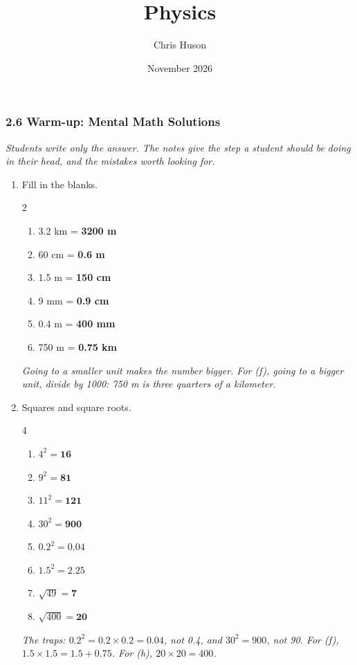 \documentclass[12pt, twoside]{article}
\title{Physics}
\author{Chris Huson}
\date{November 2026}
\begin{document}
\subsubsection*{2.6 Warm-up: Mental Math Solutions}

\emph{Students write only the answer. The notes give the step a student should be
doing in their head, and the mistakes worth looking for.}

\begin{enumerate}[itemsep=0.3cm]

\item Fill in the blanks.
  \begin{multicols}{2}
    \begin{enumerate}[itemsep=0.1cm]
      \item 3.2 km = \textbf{3200 m}
      \item 60 cm = \textbf{0.6 m}
      \item 1.5 m = \textbf{150 cm}
      \item 9 mm = \textbf{0.9 cm}
      \item 0.4 m = \textbf{400 mm}
      \item 750 m = \textbf{0.75 km}
    \end{enumerate}
  \end{multicols}
  \emph{Going to a smaller unit makes the number bigger. For (f), going to a bigger
  unit, divide by 1000: 750 m is three quarters of a kilometer.}

\item Squares and square roots.
  \begin{multicols}{4}
    \begin{enumerate}[itemsep=0.1cm]
      \item $4^2 = \mathbf{16}$
      \item $9^2 = \mathbf{81}$
      \item $11^2 = \mathbf{121}$
      \item $30^2 = \mathbf{900}$
      \item $0.2^2 = \mathbf{0.04}$
      \item $1.5^2 = \mathbf{2.25}$
      \item $\sqrt{49} = \mathbf{7}$
      \item $\sqrt{400} = \mathbf{20}$
    \end{enumerate}
  \end{multicols}
  \emph{The traps: $0.2^2 = 0.2 \times 0.2 = 0.04$, not 0.4, and $30^2 = 900$, not 90.
  For (f), $1.5 \times 1.5 = 1.5 + 0.75$. For (h), $20 \times 20 = 400$.}


\end{enumerate}
\end{document}
